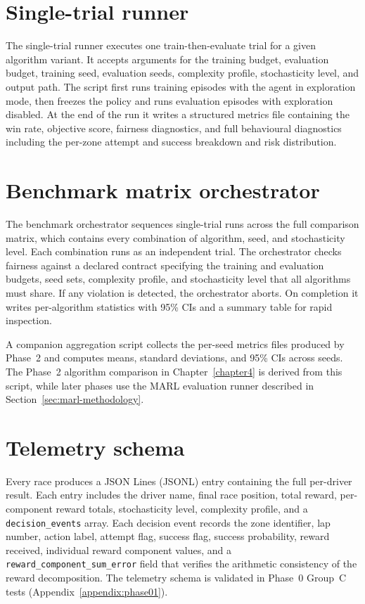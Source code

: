 \begin{appendices}
\section{Single-trial runner}

The single-trial runner executes one train-then-evaluate trial for a given algorithm variant. It accepts arguments for the training budget, evaluation budget, training seed, evaluation seeds, complexity profile, stochasticity level, and output path. The script first runs training episodes with the agent in exploration mode, then freezes the policy and runs evaluation episodes with exploration disabled. At the end of the run it writes a structured metrics file containing the win rate, objective score, fairness diagnostics, and full behavioural diagnostics including the per-zone attempt and success breakdown and risk distribution.

\section{Benchmark matrix orchestrator}

The benchmark orchestrator sequences single-trial runs across the full comparison matrix, which contains every combination of algorithm, seed, and stochasticity level. Each combination runs as an independent trial. The orchestrator checks fairness against a declared contract specifying the training and evaluation budgets, seed sets, complexity profile, and stochasticity level that all algorithms must share. If any violation is detected, the orchestrator aborts. On completion it writes per-algorithm statistics with 95\% CIs and a summary table for rapid inspection.

A companion aggregation script collects the per-seed metrics files produced by Phase~2 and computes means, standard deviations, and 95\% CIs across seeds. The Phase~2 algorithm comparison in Chapter~\ref{chapter4} is derived from this script, while later phases use the MARL evaluation runner described in Section~\ref{sec:marl-methodology}.

\section{Telemetry schema}

Every race produces a JSON Lines (JSONL) entry containing the full per-driver result. Each entry includes the driver name, final race position, total reward, per-component reward totals, stochasticity level, complexity profile, and a \texttt{decision\_events} array. Each decision event records the zone identifier, lap number, action label, attempt flag, success flag, success probability, reward received, individual reward component values, and a \texttt{reward\_component\_sum\_error} field that verifies the arithmetic consistency of the reward decomposition. The telemetry schema is validated in Phase~0 Group~C tests (Appendix~\ref{appendix:phase01}).


\end{appendices}
